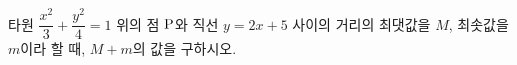타원 $\dfrac{x^2}{3}+\dfrac{y^2}{4}=1$ 위의 점 $\mathrm{P}$와 직선 $y=2x+5$ 사이의 거리의 최댓값을 $M$, 최솟값을 $m$이라 할 때, $M+m$의 값을 구하시오.
